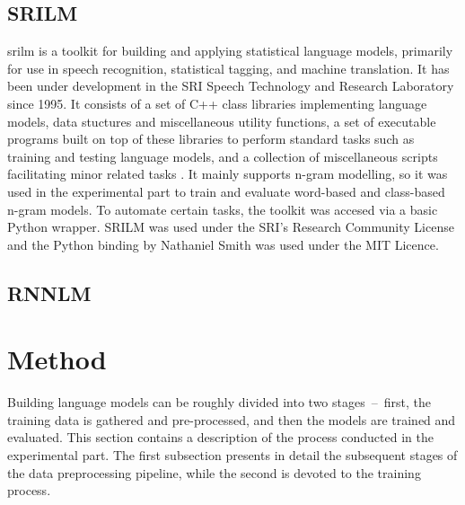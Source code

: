 \subsection{SRILM}
\gls{srilm} is a toolkit for building and applying statistical language models, primarily for use in speech recognition, statistical tagging, and machine translation. It has been under development in the SRI Speech Technology and Research Laboratory since 1995. It consists of a set of C++ class libraries implementing language models, data stuctures and miscellaneous utility functions, a set of executable programs built on top of these libraries to perform standard tasks such as training and testing language models, and a collection of miscellaneous scripts facilitating minor related tasks \cite{stolcke2011srilm}. It mainly supports n-gram modelling, so it was used in the experimental part to train and evaluate word-based and class-based n-gram models. To automate certain tasks, the toolkit was accesed via a basic Python wrapper. SRILM was used under the SRI's Research Community License and the Python binding by Nathaniel Smith was used under the MIT Licence.
\subsection{RNNLM}
\section{Method}
Building language models can be roughly divided into two stages~--~first, the training data is gathered and pre-processed, and then the models are trained and evaluated. This section contains a description of the process conducted in the experimental part. The first subsection presents in detail the subsequent stages of the data preprocessing pipeline, while the second is devoted to the training process.

